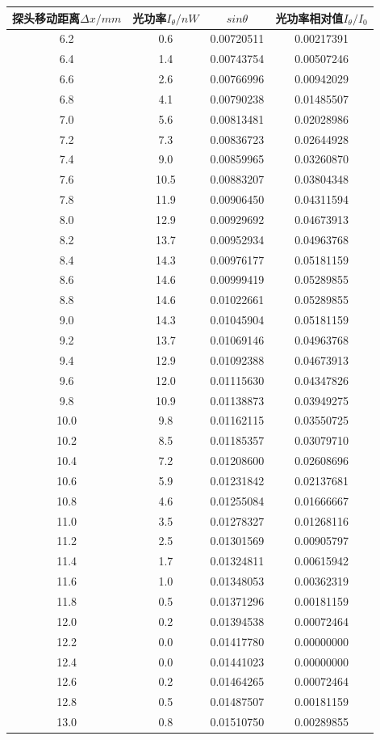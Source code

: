 \documentclass[12pt,a4paper,UTF8]{ctexart}
\begin{document}
\begin{table}[htbp]
\centering
\begin{longtable}{cccc}
\toprule
探头移动距离$\varDelta x/mm$ & 光功率$I_\theta/nW$ &$sin\theta $ &光功率相对值$I_\theta/I_0 $\\
\midrule


	6.2&0.6&0.00720511&0.00217391 \\
	6.4&1.4&0.00743754&0.00507246 \\
	6.6&2.6&0.00766996&0.00942029 \\
	6.8&4.1&0.00790238&0.01485507 \\
	7.0&5.6&0.00813481&0.02028986 \\
	7.2&7.3&0.00836723&0.02644928 \\
	7.4&9.0&0.00859965&0.03260870 \\
	7.6&10.5&0.00883207&0.03804348 \\
	7.8&11.9&0.00906450&0.04311594 \\
	8.0&12.9&0.00929692&0.04673913 \\
	8.2&13.7&0.00952934&0.04963768 \\
	8.4&14.3&0.00976177&0.05181159 \\
	8.6&14.6&0.00999419&0.05289855 \\
	8.8&14.6&0.01022661&0.05289855 \\
	9.0&14.3&0.01045904&0.05181159 \\
	9.2&13.7&0.01069146&0.04963768 \\
	9.4&12.9&0.01092388&0.04673913 \\
	9.6&12.0&0.01115630&0.04347826 \\
	9.8&10.9&0.01138873&0.03949275 \\
	10.0&9.8&0.01162115&0.03550725 \\
	10.2&8.5&0.01185357&0.03079710 \\
	10.4&7.2&0.01208600&0.02608696 \\
	10.6&5.9&0.01231842&0.02137681 \\
	10.8&4.6&0.01255084&0.01666667 \\
	11.0&3.5&0.01278327&0.01268116 \\
	11.2&2.5&0.01301569&0.00905797 \\
	11.4&1.7&0.01324811&0.00615942 \\
	11.6&1.0&0.01348053&0.00362319 \\
	11.8&0.5&0.01371296&0.00181159 \\
	12.0&0.2&0.01394538&0.00072464 \\
	12.2&0.0&0.01417780&0.00000000 \\
	12.4&0.0&0.01441023&0.00000000 \\
	12.6&0.2&0.01464265&0.00072464 \\
	12.8&0.5&0.01487507&0.00181159 \\
	13.0&0.8&0.01510750&0.00289855 \\
	\bottomrule
\end{longtable}%
\label{tab:data1}%
\end{table}%
\end{document}
